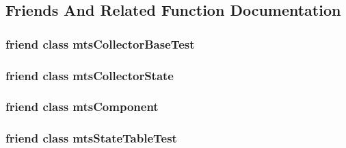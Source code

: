 \subsection{Friends And Related Function Documentation}
\hypertarget{classmts_state_table_a6743a1c340e3a1cc2078915e17f6678e}{
\subsubsection[{mts\-Collector\-Base\-Test}]{\setlength{\rightskip}{0pt plus 5cm}friend class mts\-Collector\-Base\-Test\hspace{0.3cm}{\ttfamily [friend]}}}\label{classmts_state_table_a6743a1c340e3a1cc2078915e17f6678e}
\hypertarget{classmts_state_table_ab6a86199b0302ca067ec09ec393d2ec5}{
\subsubsection[{mts\-Collector\-State}]{\setlength{\rightskip}{0pt plus 5cm}friend class {\bf mts\-Collector\-State}\hspace{0.3cm}{\ttfamily [friend]}}}\label{classmts_state_table_ab6a86199b0302ca067ec09ec393d2ec5}
\hypertarget{classmts_state_table_ae29f4c60efad294ccb670e319c43a4c1}{
\subsubsection[{mts\-Component}]{\setlength{\rightskip}{0pt plus 5cm}friend class {\bf mts\-Component}\hspace{0.3cm}{\ttfamily [friend]}}}\label{classmts_state_table_ae29f4c60efad294ccb670e319c43a4c1}
\hypertarget{classmts_state_table_a9113306eea81a3c08902921aefadbe22}{
\subsubsection[{mts\-State\-Table\-Test}]{\setlength{\rightskip}{0pt plus 5cm}friend class mts\-State\-Table\-Test\hspace{0.3cm}{\ttfamily [friend]}}}\label{classmts_state_table_a9113306eea81a3c08902921aefadbe22}
